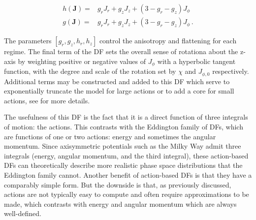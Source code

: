\begin{equation}
\label{ch1:eq:action-df-flattening-anisotropy}
\begin{split}
    h(\mathbf{J}) = & g_{r} J_{r} + g_{z} J_{z} + (3-g_{r}-g_{z}) J_{\phi} \\
    g(\mathbf{J}) = & g_{r} J_{r} + g_{z} J_{z} + (3-g_{r}-g_{z}) J_{\phi}\,.
\end{split}
\end{equation}

\noindent The parameters $[g_{r}, g_{z}, h_{r}, h_{z}]$ control the anisotropy and flattening for each regime. The final term of the DF sets the overall sense of rotationa about the z-axis by weighting positive or negative values of $J_{\phi}$ with a hyperbolic tangent function, with the degree and scale of the rotation set by $\chi$ and $J_{\phi,0}$ respectively. Additional terms may be constructed and added to this DF which serve to exponentially truncate the model for large actions or to add a core for small actions, see \textcite{binney14d} for more details.

The usefulness of this DF is the fact that it is a direct function of three integrals of motion: the actions. This contrasts with the Eddington family of DFs, which are functions of one or two actions: energy and sometimes the angular momentum. Since axisymmetric potentials such as the Milky Way admit three integrals (energy, angular momentum, and the third integral), these action-based DFs can theoretically describe more realistic phase space distributions that the Eddington family cannot. Another benefit of action-based DFs is that they have a comparably simple form. But the downside is that, as previously discussed, actions are not typically easy to compute and often require approximations to be made, which contrasts with energy and angular momentum which are always well-defined.